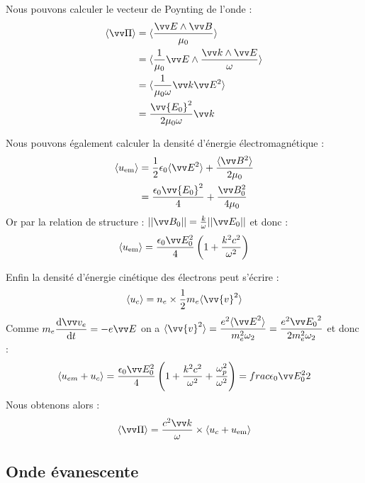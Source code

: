\documentclass[11pt,fleqn]{book} %
\newcommand{\dd}{\mathrm{d}}
\begin{document}
\begin{demonstration}

Nous pouvons calculer le vecteur de Poynting de l'onde :
\begin{align}
	\langle \vv \Pi \rangle &= \langle \frac{\vv E \wedge \vv B}{\mu_0} \rangle \\
	&= \langle \frac{1}{\mu_0} \vv E \wedge \frac{\vv k \wedge \vv E}{\omega} \rangle \\
	&= \langle \frac{1}{\mu_0 \omega} \vv k \vv E^2 \rangle \\
	&= \frac{\vv{E_0}^2}{2 \mu_0 \omega} \vv k
\end{align}

Nous pouvons également calculer la densité d'énergie électromagnétique :
\begin{align}
	\langle u_{\rm em} \rangle &= \frac{1}{2} \epsilon_0 \langle \vv E^2 \rangle + \frac{\langle \vv B^2 \rangle}{2 \mu_0} \\
	&= \frac{\epsilon_0 \vv{E_0}^2}{4} + \frac{\vv B_0^2}{4 \mu_0} 
\end{align}
Or par la relation de structure : $||\vv B_0|| = \frac{k}{\omega} ||\vv E_0||$ et donc :
\begin{equation}
	\langle u_{\rm em} \rangle = \frac{\epsilon_0 \vv E_0^2}{4} \left( 1 + \frac{k^2 c^2}{\omega^2} \right)
\end{equation}

Enfin la densité d'énergie cinétique des électrons peut s'écrire :
\begin{equation}
	\langle u_c \rangle = n_e \times \frac{1}{2} m_e \langle \vv{v}^2 \rangle 
\end{equation}
	Comme $m_e \dfrac{\dd \vv v_e}{\dd t} = - e \vv E$ on a $\langle \vv{v}^2 \rangle = \dfrac{e^2 \langle {\vv E}^2 \rangle}{m_e^2 \omega_2} = \dfrac{e^2 {\vv E_0}^2}{2 m_e^2 \omega_2}$ et donc :
\begin{equation}
	\langle u_{em} + u_c \rangle = \frac{\epsilon_0 \vv E_0^2}{4} \left( 1 + \frac{k^2 c^2}{\omega^2} + \frac{\omega_p^2}{\omega^2} \right) = frac{\epsilon_0 \vv E_0^2}{2}
\end{equation}
Nous obtenons alors :
\begin{equation}
	\langle \vv \Pi \rangle = \frac{c^2 \vv k}{\omega} \times \langle u_c + u_{\rm em} \rangle
\end{equation}

\end{demonstration}

\subsection{Onde évanescente}
\end{document}
